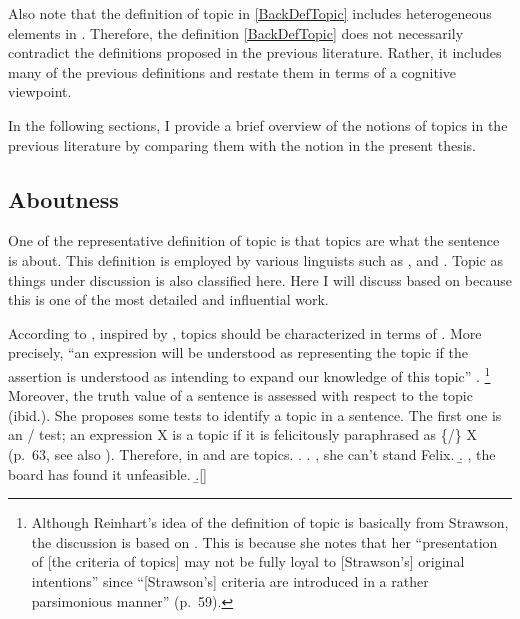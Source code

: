 Also note that the definition of topic in \ref{BackDefTopic} includes heterogeneous elements in \Last.
Therefore, the definition \ref{BackDefTopic} does not necessarily contradict the definitions proposed in the previous literature.
Rather, it includes many of the previous definitions and restate them in terms of a cognitive viewpoint.

In the following sections, I provide a brief overview of the notions of topics in the previous literature by comparing them with the notion in the present thesis.

\subsection{Aboutness}

One of the representative definition of topic is that
topics are what the sentence is about.
This definition is employed by various linguists such as , and .
Topic as things under discussion \cite[e.g.,][]{heycock08} is also classified here.
Here I will discuss based on  because this is one of the most detailed and influential work.

According to ,
inspired by ,
topics should be characterized in terms of .
More precisely,
``an expression will be understood as representing the topic
if the assertion is understood as intending to expand our knowledge of this topic'' \cite[p.~59]{reinhart81}.%
  \footnote{
  Although Reinhart's idea of the definition of topic is basically from Strawson,
  the discussion is based on .
  This is because she notes that her ``presentation of [the criteria of topics] may not be fully loyal to [Strawson's] original intentions'' since ``[Strawson's] criteria are introduced in a rather parsimonious manner'' (p.~59).
  }
Moreover, the truth value of a sentence is assessed with respect to the topic ({ibid.}).
She proposes some tests to identify a topic in a sentence.
The first one is an / test;
an expression X is a topic if it is felicitously paraphrased as \{/\} X (p.~63, see also ).
Therefore,  in \Next[a] and  \Next[b] are topics.
%
\ex. \a. , she can't stand Felix.
     \b. , the board has found it unfeasible.
     \b.[] \hfill{\cite[59]{reinhart81}}

